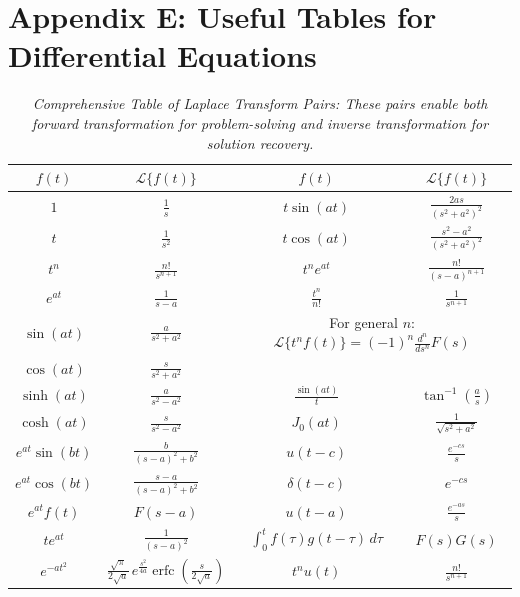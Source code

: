 \chapter*{Appendix E: Useful Tables for Differential Equations}

{
  \renewcommand{\arraystretch}{2} %
  \begin{table}[H]
    \centering
    \caption{\textit{Comprehensive Table of Laplace Transform Pairs: These pairs enable both forward transformation for problem-solving and inverse transformation for solution recovery.}}
    \label{table:laplace_transforms_appendix}
    \begin{tabular}{|c|c||c|c|}
      \hline
      \( f(t) \) & \(\mathcal{L}\{f(t)\}\) & \( f(t) \) & \(\mathcal{L}\{f(t)\}\) \\ \hline
      \(1\) & \(\frac{1}{s}\) & \(t\sin(at)\) & \(\frac{2as}{(s^2+a^2)^2}\) \\ \hline
      \(t\) & \(\frac{1}{s^2}\) & \(t\cos(at)\) & \(\frac{s^2-a^2}{(s^2+a^2)^2}\) \\ \hline
      \(t^n\) & \(\frac{n!}{s^{n+1}}\) & \(t^ne^{at}\) & \(\frac{n!}{(s-a)^{n+1}}\) \\ \hline
      \(e^{at}\) & \(\frac{1}{s-a}\) & \(\frac{t^n}{n!}\) & \(\frac{1}{s^{n+1}}\) \\ \hline
      \(\sin(at)\) & \(\frac{a}{s^2+a^2}\) & \multicolumn{2}{c|}{For general \(n\): \(\mathcal{L}\{t^n f(t)\} = (-1)^n \frac{d^n}{ds^n} F(s)\)} \\ \hline
      \(\cos(at)\) & \(\frac{s}{s^2+a^2}\) & & \\ \hline
      \(\sinh(at)\) & \(\frac{a}{s^2-a^2}\) & \(\frac{\sin(at)}{t}\) & \(\tan^{-1}\!\left(\frac{a}{s}\right)\) \\ \hline
      \(\cosh(at)\) & \(\frac{s}{s^2-a^2}\) & \(J_0(at)\) & \(\frac{1}{\sqrt{s^2+a^2}}\) \\ \hline
      \(e^{at}\sin(bt)\) & \(\frac{b}{(s-a)^2+b^2}\) & \(u(t-c)\) & \(\frac{e^{-cs}}{s}\) \\ \hline
      \(e^{at}\cos(bt)\) & \(\frac{s-a}{(s-a)^2+b^2}\) & \(\delta(t-c)\) & \(e^{-cs}\) \\ \hline
      \(e^{at}f(t)\) & \(F(s-a)\) & \(u(t-a)\) & \(\frac{e^{-as}}{s}\) \\ \hline
      \(te^{at}\) & \(\frac{1}{(s-a)^2}\) & \(\displaystyle \int_{0}^{t} f(\tau)g(t-\tau)\,d\tau\) & \(F(s)G(s)\) \\ \hline
      \(e^{-at^2}\) & \(\frac{\sqrt{\pi}}{2\sqrt{a}}\,e^{\frac{s^2}{4a}}\operatorname{erfc}\!\left(\frac{s}{2\sqrt{a}}\right)\) & \(t^n u(t)\) & \(\frac{n!}{s^{n+1}}\) \\ \hline
    \end{tabular}
  \end{table}
}

